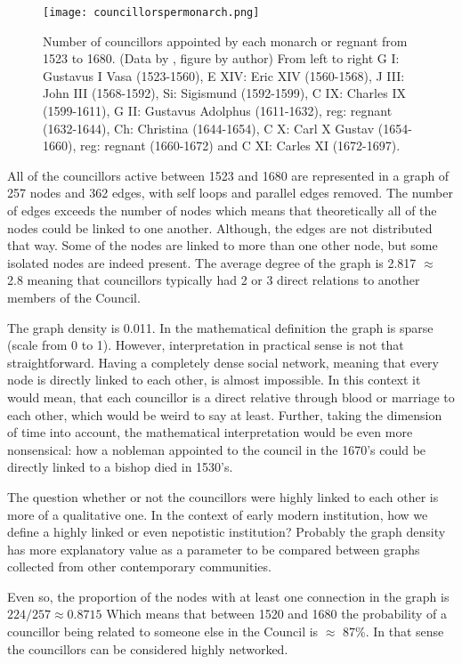 \begin{figure}
	\texttt{[image: councillorspermonarch.png]}
	\centering
	\caption[Number of councillors appointed by each ruler between 1523-1680] {Number of councillors appointed by each monarch or regnant from 1523 to 1680. (Data by \cite{councillorsDS}, figure by author) From left to right G I: Gustavus I Vasa (1523-1560), E XIV: Eric XIV (1560-1568), J III: John III (1568-1592), Si: Sigismund (1592-1599), C IX: Charles IX (1599-1611), G II: Gustavus Adolphus (1611-1632), reg: regnant (1632-1644), Ch: Christina (1644-1654), C X: Carl X Gustav (1654-1660), reg: regnant (1660-1672) and C XI: Carles XI (1672-1697).}
	\centering
\end{figure}

All of the councillors active between 1523 and 1680 are represented in a graph of 257 nodes and 362 edges, with self loops and parallel edges removed. The number of edges exceeds the number of nodes which means that theoretically all of the nodes could be linked to one another. Although, the edges are not distributed that way. Some of the nodes are linked to more than one other node, but some isolated nodes are indeed present. The average degree of the graph is 2.817 $\approx$ 2.8 meaning that councillors typically had 2 or 3 direct relations to another members of the Council.

The graph density is 0.011. In the mathematical definition the graph is sparse (scale from 0 to 1). However, interpretation in practical sense is not that straightforward. Having a completely dense social network, meaning that every node is directly linked to each other, is almost impossible. In this context it would mean, that each councillor is a direct relative through blood or marriage to each other, which would be weird to say at least. Further, taking the dimension of time into account, the mathematical interpretation would be even more nonsensical: how a nobleman appointed to the council in the 1670's could be directly linked to a bishop died in 1530's. 

The question whether or not the councillors were highly linked to each other is more of a qualitative one. In the context of early modern institution, how we define a highly linked or even nepotistic institution? Probably the graph density has more explanatory value as a parameter to be compared between graphs collected from other contemporary communities.

Even so, the proportion of the nodes with at least one connection in the graph is $224/257 \approx 0.8715$ Which means that between 1520 and 1680 the probability of a councillor being related to someone else in the Council is $\approx$ 87\%. In that sense the councillors can be considered highly networked.

